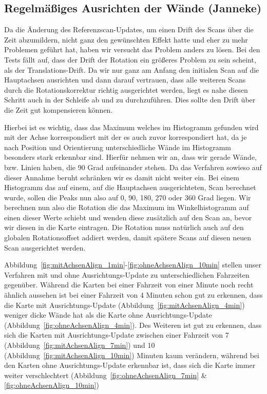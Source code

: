 \subsection{Regelmäßiges Ausrichten der Wände (Janneke)}

Da die Änderung des Referenzscan-Updates, um einen Drift des Scans über die Zeit abzumildern, nicht ganz den gewünschten Effekt hatte und eher zu mehr Problemen geführt hat, haben wir versucht das Problem anders zu lösen. Bei den Tests fällt auf, dass der Drift der Rotation ein größeres Problem zu sein scheint, als der Translations-Drift. Da wir nur ganz am Anfang den initialen Scan auf die Hauptachsen ausrichten und dann darauf vertrauen, dass alle weiteren Scans durch die Rotationskorrektur richtig ausgerichtet werden, liegt es nahe diesen Schritt auch in der Schleife ab und zu durchzuführen. Dies sollte den Drift über die Zeit gut kompensieren können.

Hierbei ist es wichtig, dass das Maximum welches im Histogramm gefunden wird mit der Achse korrespondiert mit der es auch zuvor korrespondiert hat, da je nach Position und Orientierung unterschiedliche Wände im Histogramm besonders stark erkennbar sind. Hierfür nehmen wir an, dass wir gerade Wände, bzw. Linien haben, die 90 Grad aufeinander stehen. Da das Verfahren sowieso auf dieser Annahme beruht schränken wir es damit nicht weiter ein. Bei einem Histogramm das auf einem, auf die Hauptachsen ausgerichteten, Scan berechnet wurde, sollen die Peaks nun also auf 0, 90, 180, 270 oder 360 Grad liegen. Wir berechnen nun also die Rotation die das Maximum im Winkelhistogramm auf einen dieser Werte schiebt und wenden diese zusätzlich auf den Scan an, bevor wir diesen in die Karte eintragen. Die Rotation muss natürlich auch auf den globalen Rotationsoffset addiert werden, damit spätere Scans auf diesen neuen Scan ausgerichtet werden.

Abbildung~\ref{fig:mitAchsenAlign_1min}-\ref{fig:ohneAchsenAlign_10min} stellen unser Verfahren mit und ohne Ausrichtungs-Update zu unterschiedlichen Fahrzeiten gegenüber. Während die Karten bei einer Fahrzeit von einer Minute noch recht ähnlich aussehen ist bei einer Fahrzeit von 4 Minuten schon gut zu erkennen, dass die Karte mit Ausrichtungs-Update (Abbildung~\ref{fig:mitAchsenAlign_4min}) weniger dicke Wände hat als die Karte ohne Ausrichtungs-Update (Abbildung~\ref{fig:ohneAchsenAlign_4min}). Des Weiteren ist gut zu erkennen, dass sich die Karten mit Ausrichtungs-Update zwischen einer Fahrzeit von 7 (Abbildung~\ref{fig:mitAchsenAlign_7min}) und 10 (Abbildung~\ref{fig:mitAchsenAlign_10min}) Minuten kaum verändern, während bei den Karten ohne Ausrichtungs-Update erkennbar ist, dass sich die Karte immer weiter verschlechtert (Abbildung~\ref{fig:ohneAchsenAlign_7min} \& \ref{fig:ohneAchsenAlign_10min})  

